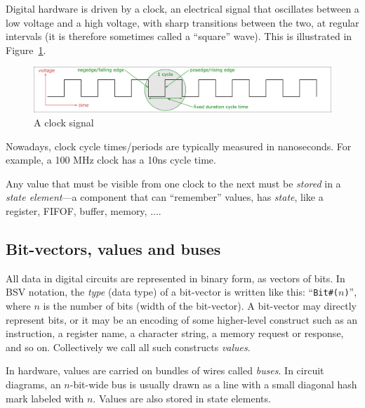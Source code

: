 Digital hardware is driven by a clock, an electrical signal that
oscillates between a low voltage and a high voltage, with sharp
transitions between the two, at regular intervals (it is therefore
sometimes called a ``square'' wave).  This is illustrated in
Figure~\ref{Fig_Clock_1}.

\begin{figure}[htbp]
  \centerline{\includegraphics[width=6in,angle=0]{Figures/Fig_Clock}}
  \caption{\label{Fig_Clock_1}A clock signal}
\end{figure}

Nowadays, clock cycle times/periods are typically measured in
nanoseconds. For example, a 100 MHz clock has a 10ns cycle time.


Any value that must be visible from one clock to the next must be
\emph{stored} in a \emph{state element}---a component that can
``remember'' values, {\ie} has \emph{state}, like a register, FIFOF,
buffer, memory, ....


\subsection{Bit-vectors, values and buses}


All data in digital circuits are represented in binary form, as
vectors of bits.  In BSV notation, the \emph{type} (data type) of a
bit-vector is written like this: ``{\tt Bit\#($n$)}'', where $n$ is
the number of bits (width of the bit-vector).  A bit-vector may
directly represent bits, or it may be an encoding of some higher-level
construct such as an instruction, a register name, a character string,
a memory request or response, and so on.  Collectively we call all
such constructs \emph{values}.

In hardware, values are carried on bundles of wires called
\emph{buses}.  In circuit diagrams, an $n$-bit-wide bus is usually
drawn as a line with a small diagonal hash mark labeled with $n$.
Values are also stored in state elements.

